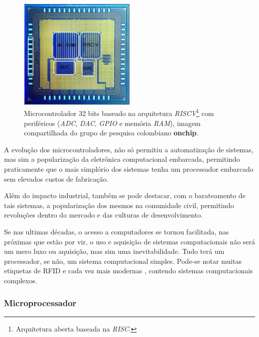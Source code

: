 \begin{figure}[!htb]
  \centering
  \caption[Microcontrolador na pastilha de silício.]{Microcontrolador 32 bits baseado na arquitetura \textit{RISCV}\footnote{Arquitetura aberta baseada na \textit{RISC}.}
  com periféricos (\textit{ADC}, \textit{DAC}, \textit{GPIO} e memória \textit{RAM}), imagem compartilhada do grupo de pesquisa
  colombiano \textbf{onchip}.}
  \label{fig:ricv}
  \includegraphics[width=0.5\textwidth]{figuras/riscv.jpg}
\end{figure}


A evolução dos microcontroladores, não só permitiu a automatização de sistemas, mas sim a popularização da eletrônica
computacional embarcada, permitindo praticamente que o mais simplório dos sistemas tenha um processador embarcado sem
elevados custos de fabricação.

Além do impacto industrial, também se pode destacar, com o barateamento de tais sistemas, a popularização dos mesmos na
comunidade civil, permitindo revoluções dentro do mercado e das culturas de desenvolvimento.

Se nas ultimas décadas, o acesso a computadores se tornou facilitada, nas próximas que estão por vir, o uso e aquisição de sistemas computacionais não será um mero luxo ou aquisição, mas sim uma inevitabilidade. Tudo terá um processador, se não, um sistema computacional simples. Pode-se notar muitas etiquetas de RFID e cada vez mais modernas \cite{ricci2008design}, contendo sistemas computacionais complexos.

\subsubsection{Microprocessador}

